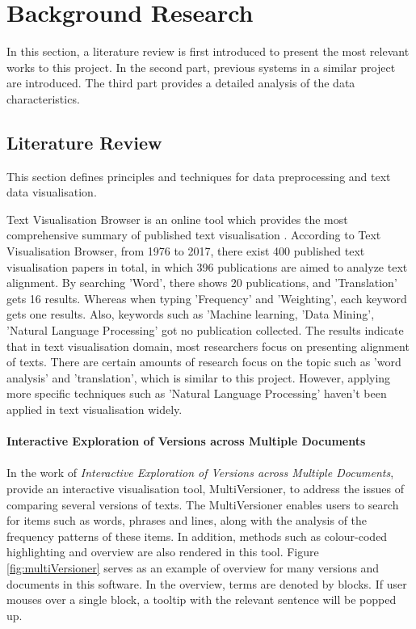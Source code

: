 \clearpage
\section{Background Research}

In this section, a literature review is first introduced to present the most relevant works to this project. In the second part, previous systems in a similar project are introduced. The third part provides a detailed analysis of the data characteristics.

\subsection{Literature Review}

This section defines principles and techniques for data preprocessing and text data visualisation.

Text Visualisation Browser \cite{Kucher2014} is an online tool which provides the most comprehensive summary of published text visualisation \cite{Cao2016}. According to Text Visualisation Browser, from 1976 to 2017, there exist 400 published text visualisation papers in total, in which 396 publications are aimed to analyze text alignment. By searching 'Word', there shows 20 publications, and 'Translation' gets 16 results. Whereas when typing 'Frequency' and 'Weighting', each keyword gets one results. Also, keywords such as 'Machine learning, 'Data Mining', 'Natural Language Processing' got no publication collected. The results indicate that in text visualisation domain, most researchers focus on presenting alignment of texts. There are certain amounts of research focus on the topic such as 'word analysis' and 'translation', which is similar to this project. However, applying more specific techniques such as 'Natural Language Processing' haven't been applied in text visualisation widely.


\paragraph{Interactive Exploration of Versions across Multiple Documents}

\paragraph[]{}In the work of \emph{Interactive Exploration of Versions across Multiple Documents}, \cite{Jong2008} provide an interactive visualisation tool, MultiVersioner, to address the issues of comparing several versions of texts. The MultiVersioner enables users to search for items such as words, phrases and lines, along with the analysis of the frequency patterns of these items. In addition, methods such as colour-coded highlighting and overview are also rendered in this tool. Figure \ref{fig:multiVersioner} serves as an example of overview for many versions and documents in this software. In the overview, terms are denoted by blocks. If user mouses over a single block, a tooltip with the relevant sentence will be popped up.

